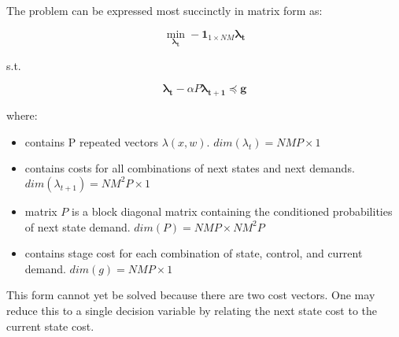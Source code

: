 \documentclass{article}
\begin{document}
	The problem can be expressed most succinctly in matrix form as:
	
	\begin{equation}
	\min_{\boldsymbol{\lambda_{t}}} -\boldsymbol{1}_{1\times NM} \boldsymbol{\lambda_{t}}
	\end{equation}
	
	s.t.
	
	\begin{displaymath} 
	\boldsymbol{\lambda_{t}}-\alpha P\boldsymbol{\lambda_{t+1}} \preceq \boldsymbol{g}
	\end{displaymath}
	
	where:
	
	\begin{itemize}
		\item {} contains P repeated vectors $\lambda(x,w)$. $dim(\lambda_{t})=NMP\times 1$
		
		\item {} contains costs for all combinations of next states and next demands. $dim(\lambda_{t+1})=NM^{2}P\times 1$
		
		\item matrix $P$ is a block diagonal  matrix containing the conditioned probabilities of next state demand. $dim(P)=NMP\times NM^{2}P$
		
		\item {} contains stage cost for each combination of state, control, and current demand. $dim(g)=NMP\times 1$
		
	\end{itemize}
	
	This form cannot yet be solved because there are two cost vectors. One may reduce this to a single decision variable by relating the next state cost to the current state cost.
	
\end{document}
